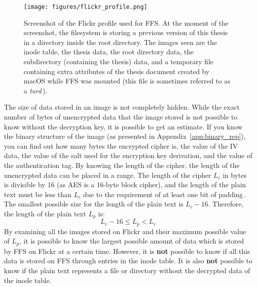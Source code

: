 
\begin{figure}[!h]
	\begin{center}
	  \texttt{[image: figures/flickr\_profile.png]}
	\end{center}
	\caption[Screenshot of the Flickr profile used for \gls{FFS}]{Screenshot of the Flickr profile used for \gls{FFS}. At the moment of the screenshot, the filesystem is storing a previous version of this thesis in a directory inside the root directory. The images seen are the inode table, the thesis data, the root directory data, the subdirectory (containing the thesis) data, and a temporary file containing extra attributes of the thesis document created by macOS while \gls{FFS} was mounted (this file is sometimes referred to as a \textit{turd}\,\cite{geekosaurAnswerWhyAre2011}).}
	\label{fig:flickr_profile}
\end{figure}

The size of data stored in an image is not completely hidden. While the exact number of bytes of unencrypted data that the image stored is not possible to know without the decryption key, it is possible to get an estimate. If you know the binary structure of the image (as presented in Appendix~\ref{app:binary_rep}), you can find out how many bytes the encrypted cipher is, the value of the \gls{IV} data, the value of the salt used for the encryption key derivation, and the value of the authentication tag. By knowing the length of the cipher, the length of the unencrypted data can be placed in a range. The length of the cipher $L_c$ in bytes is divisible by 16 (as \gls{AES} is a \mbox{16-byte} block cipher), and the length of the plain text must be less than $L_c$ due to the requirement of at least one bit of padding\,\cite{z.z.coderAnswerSizeData2010}. The smallest possible size for the length of the plain text is $L_c - 16$. Therefore, the length of the plain text $L_p$ is:
$$
	L_c - 16 \leq L_p < L_c
$$
By examining all the images stored on Flickr and their maximum possible value of $L_p$, it is possible to know the largest possible amount of data which is stored by \gls{FFS} on Flickr at a certain time. However, it is \textbf{not} possible to know if all this data is stored on \gls{FFS} through entries in the inode table. It is also \textbf{not} possible to know if the plain text represents a file or directory without the decrypted data of the inode table.

